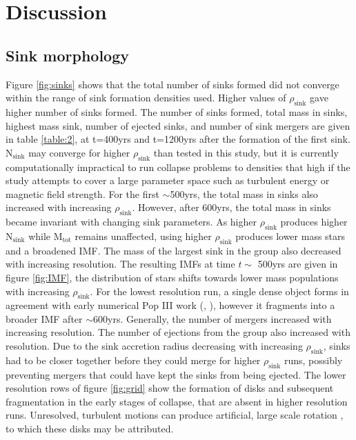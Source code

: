 \documentclass[fleqn,usenatbib]{mnras}
\begin{document}
\section{Discussion}
\subsection{Sink morphology}
\label{study1}
Figure \ref{fig:sinks} shows that the total number of sinks formed did not converge within the range of sink formation densities used. Higher values of $\rho_{\text{sink}}$ gave higher number of sinks formed. The number of sinks formed, total mass in sinks, highest mass sink, number of ejected sinks, and number of sink mergers are given in table \ref{table:2}, at t=400yrs and t=1200yrs after the formation of the first sink. N$_{\text{sink}}$ may converge for higher $\rho_{\text{sink}}$ than tested in this study, but it is currently computationally impractical to run collapse problems to densities that high if the study attempts to cover a large parameter space such as turbulent energy or magnetic field strength. For the first $\sim$500yrs, the total mass in sinks also increased with increasing $\rho_{\text{sink}}$. However, after 600yrs, the total mass in sinks became invariant with changing sink parameters. As higher $\rho_{\text{sink}}$ produces higher N$_{\text{sink}}$ while M$_{\text{tot}}$ remains unaffected, using higher $\rho_{\text{sink}}$ produces lower mass stars and a broadened IMF. The mass of the largest sink in the group also decreased with increasing resolution. The resulting IMFs at time $t\sim$ 500yrs are given in figure \ref{fig:IMF}, the distribution of stars shifts towards lower mass populations with increasing $\rho_{\text{sink}}$. For the lowest resolution run, a single dense object forms in agreement with early numerical Pop III work (\citealt{Bromm1999}, \citealt{Haiman1996}), however it fragments into a broader IMF after $\sim$600yrs. Generally, the number of mergers increased with increasing resolution. The number of ejections from the group also increased with resolution. Due to the sink accretion radius decreasing with increasing $\rho_{\text{sink}}$, sinks had to be closer together before they could merge for higher $\rho_{\text{sink}}$ runs, possibly preventing mergers that could have kept the sinks from being ejected. The lower resolution rows of figure \ref{fig:grid} show the formation of disks and subsequent fragmentation in the early stages of collapse, that are absent in higher resolution runs. Unresolved, turbulent motions can produce artificial, large scale rotation \citep{Seifried2017}, to which these disks may be attributed. 
\end{document}

